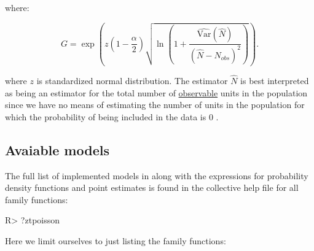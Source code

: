 \documentclass[
]{jss}
\newcommand{\1}{\mathcal{I}} \newcommand{\bZero}{\boldsymbol{0}}
\begin{document}
where:

\begin{equation*}
  G = \exp\left(z\left(1-\frac{\alpha}{2}\right)
  \sqrt{\ln\left(1+\frac{\widehat{\text{Var}}(\hat{N})}{\left(\hat{N}-N_{obs}\right)^{2}}\right)}\right).
\end{equation*}

where \(z\) is standardized normal distribution. The estimator
\(\hat{N}\) is best interpreted as being an estimator for the total
number of \underline{observable} units in the population since we have
no means of estimating the number of units in the population for which
the probability of being included in the data is \(0\)
\citep[cf.][]{ztpoisson}.

\subsection{Avaiable models}\label{avaiable-models}

The full list of implemented models in  along with
the expressions for probability density functions and point estimates is
found in the collective help file for all family functions:

\begin{CodeChunk}
\begin{CodeInput}
R> ?ztpoisson
\end{CodeInput}
\end{CodeChunk}

Here we limit ourselves to just listing the family functions:
\end{document}
